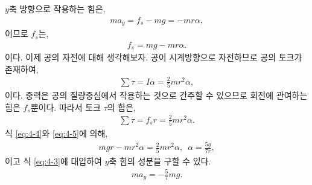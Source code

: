 \documentclass[floatfix,nofootinbib,superscriptaddress,fleqn]{revtex4-2}
\begin{document}
\begin{itemize}
  $y$축 방향으로 작용하는 힘은,
  \begin{align}\label{eq:4-3}
    ma_y = f_s - mg = -mr\alpha,
  \end{align}
  이므로 $f_s$는,
  \begin{align}\label{eq:4-4}
    f_s = mg-mr\alpha.
  \end{align}
  이다. 이제 공의 자전에 대해 생각해보자.
  공이 시계방향으로 자전하므로 공의 토크가 존재하여,
  \begin{align}
    \sum \tau = I\alpha = \frac{2}{5}mr^2\alpha,
  \end{align}
  이다. 중력은 공의 질량중심에서 작용하는 것으로 간주할 수 있으므로 회전에 관여하는 힘은 
  $f_s$뿐이다. 따라서 토크 $\tau$의 합은,
  \begin{align}\label{eq:4-5}
    \sum \tau = f_s r = \frac{2}{5}mr^2\alpha.
  \end{align}
  식 \eqref{eq:4-4}와 \eqref{eq:4-5}에 의해,
  \begin{align}
    mgr - mr^2\alpha = \frac{2}{5}mr^2\alpha,\,\,\,
    \alpha = \frac{5g}{7r},
  \end{align}
  이고 식 \eqref{eq:4-3}에 대입하여 $y$축 힘의 성분을 구할 수 있다.
  \begin{align}
    ma_y = -\frac{5}{7}mg.
  \end{align}

\end{itemize}
\end{document}
